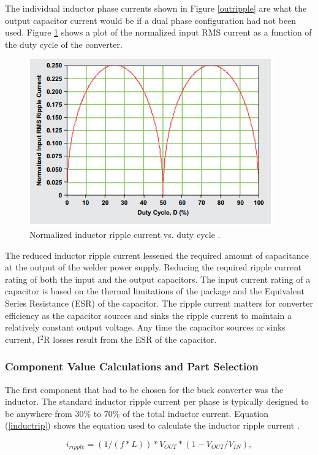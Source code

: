 \documentclass[11pt]{article}
\begin{document}
    \noindent The individual inductor phase currents shown in Figure \ref{outripple} are what the output capacitor current would be if a dual phase configuration had not been used. Figure \ref{inripple} shows a plot of the normalized input RMS current as a function of the duty cycle of the converter. 
    
    \begin{figure}[H]
            \centering
            \includegraphics[width=0.4\linewidth]{inputripple.PNG}
            \caption{Normalized inductor ripple current vs. duty cycle \cite{david_baba_benefits_2012}.}
            \label{inripple}
        \end{figure}
    
    \noindent The reduced inductor ripple current lessened the required amount of capacitance at the output of the welder power supply. Reducing the required ripple current rating of both the input and the output capacitors. The input current rating of a capacitor is based on the thermal limitations of the package and the Equivalent Series Resistance (ESR) of the capacitor. The ripple current matters for converter efficiency as the capacitor sources and sinks the ripple current to maintain a relatively constant output voltage. Any time the capacitor sources or sinks current, I$^2$R losses result from the ESR of the capacitor. 
    
    \subsubsection{Component Value Calculations and Part Selection}
    \noindent The first component that had to be chosen for the buck converter was the inductor.
    The standard inductor ripple current per phase is typically designed to be anywhere from 30\% to 70\% of the total inductor current. Equation (\ref{inductrip}) shows the equation used to calculate the inductor ripple current \cite{linear_technology_ltc3892:_nodate}.
    
    \begin{equation}
        i_{ripple}=(1/(f*L))*V_{OUT}*(1-V_{OUT}/V_{IN}),
        \label{inductrip}
    \end{equation}
   
\end{document}
